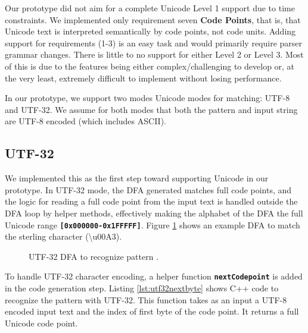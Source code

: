 Our prototype did not aim for a complete Unicode Level 1 support due to time constraints. We implemented only requirement seven \textbf{Code Points}, that is, that Unicode text is interpreted semantically by code points, not code units. Adding support for requirements (1-3) is an easy task and would primarily require parser grammar changes. There is little to no support for either Level 2 or Level 3. Most of this is due to the features being either complex/challenging to develop or, at the very least, extremely difficult to implement without losing performance.

In our prototype, we support two modes Unicode modes for matching: UTF-8 and UTF-32. We assume for both modes that both the pattern and input string are UTF-8 encoded (which includes ASCII).

\subsection{UTF-32}
We implemented this as the first step toward supporting Unicode in our prototype. 
In UTF-32 mode, the DFA generated matches full code points, and the logic for reading a full code point from the input text is handled outside the DFA loop by helper methods, effectively making the alphabet of the DFA the full Unicode range \texttt{\textbf{[0x000000-0x1FFFFF]}}. Figure \ref{fig:utf32exdfa} shows an example DFA to match the sterling character \texttt{\textbf{\textsterling}} (\textbackslash u00A3).

\begin{figure}[H]
\centering
\usetikzlibrary{fit}
\caption[DFA to recognize pattern \texttt{\textsterling}]{UTF-32 DFA to recognize pattern \texttt{\textsterling}.}
\label{fig:utf32exdfa}
\end{figure}

To handle UTF-32 character encoding, a helper function \texttt{\textbf{nextCodepoint}} is added in the code generation step. Listing \ref{lst:utf32nextbyte} shows C++ code to recognize the pattern \texttt{\textbf{\textsterling}} with UTF-32. This function takes as an input a UTF-8 encoded input text and the index of first byte of the code point. It returns a full Unicode code point.

